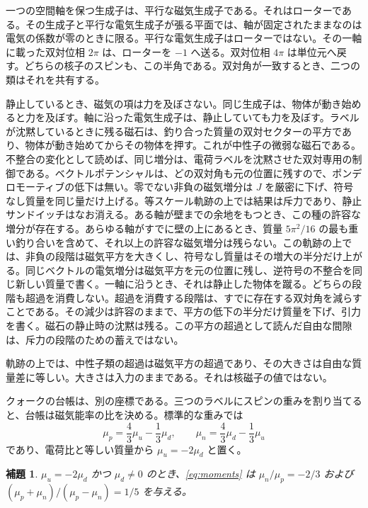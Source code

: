 \documentclass[a4paper]{article}
\newtheorem{lemma}{補題}
\begin{document}
一つの空間軸を保つ生成子は、平行な磁気生成子である。それはローターである。その生成子と平行な電気生成子が張る平面では、軸が固定されたままなのは電気の係数が零のときに限る。平行な電気生成子はローターではない。その一軸に載った双対位相 \(2\pi\) は、ローターを \(-1\) へ送る。双対位相 \(4\pi\) は単位元へ戻す。どちらの核子のスピンも、この半角である。双対角が一致するとき、二つの類はそれを共有する。

静止しているとき、磁気の項は力を及ぼさない。同じ生成子は、物体が動き始めると力を及ぼす。軸に沿った電気生成子は、静止していても力を及ぼす。ラベルが沈黙しているときに残る磁石は、釣り合った質量の双対セクターの平方であり、物体が動き始めてからその物体を押す。これが中性子の微弱な磁石である。不整合の変化として読めば、同じ増分は、電荷ラベルを沈黙させた双対専用の制御である。ベクトルポテンシャルは、どの双対角も元の位置に残すので、ポンデロモーティブの低下は無い。零でない非負の磁気増分は \(J\) を厳密に下げ、符号なし質量を同じ量だけ上げる。等スケール軌跡の上では結果は斥力であり、静止サンドイッチはなお消える。ある軸が壁までの余地をもつとき、この種の許容な増分が存在する。あらゆる軸がすでに壁の上にあるとき、質量 \(5\pi^2/16\) の最も重い釣り合いを含めて、それ以上の許容な磁気増分は残らない。この軌跡の上では、非負の段階は磁気平方を大きくし、符号なし質量はその増大の半分だけ上がる。同じベクトルの電気増分は磁気平方を元の位置に残し、逆符号の不整合を同じ新しい質量で書く。一軸に沿うとき、それは静止した物体を蹴る。どちらの段階も超過を消費しない。超過を消費する段階は、すでに存在する双対角を減らすことである。その減少は許容のままで、平方の低下の半分だけ質量を下げ、引力を書く。磁石の静止時の沈黙は残る。この平方の超過として読んだ自由な間隙は、斥力の段階のための蓄えではない。

軌跡の上では、中性子類の超過は磁気平方の超過であり、その大きさは自由な質量差に等しい。大きさは入力のままである。それは核磁子の値ではない。

クォークの台帳は、別の座標である。三つのラベルにスピンの重みを割り当てると、台帳は磁気能率の比を決める。標準的な重みでは
\begin{equation}
\label{eq:moments}
\mu_p=\frac43\mu_u-\frac13\mu_d,
\qquad
\mu_n=\frac43\mu_d-\frac13\mu_u
\end{equation}
であり、電荷比と等しい質量から \(\mu_u=-2\mu_d\) と置く。

\begin{lemma}
\label{lem:moments}
\(\mu_u=-2\mu_d\) かつ \(\mu_d\neq 0\) のとき、\eqref{eq:moments} は \(\mu_n/\mu_p=-2/3\) および \((\mu_p+\mu_n)/(\mu_p-\mu_n)=1/5\) を与える。
\end{lemma}
\end{document}
